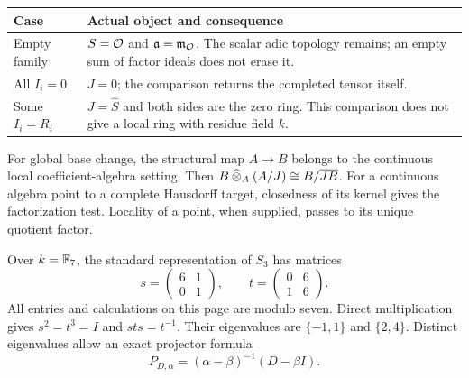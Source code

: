\begin{center}\small
\begin{tabularx}{\linewidth}{@{}p{.22\linewidth}Y@{}}\toprule
Case & Actual object and consequence\\\midrule
Empty family & $S=\mathcal O$ and $\mathfrak a=\mathfrak m_\mathcal O$. The scalar adic topology remains; an empty sum of factor ideals does not erase it.\\
All $I_i=0$ & $J=0$; the comparison returns the completed tensor itself.\\
Some $I_i=R_i$ & $J=\widehat S$ and both sides are the zero ring. This comparison does not give a local ring with residue field $k$.\\\bottomrule
\end{tabularx}
\end{center}

For global base change, the structural map $A\to B$ belongs to the continuous local coefficient-algebra setting. Then $B\mathbin{\widehat\otimes}_A(A/J)\cong B/\overline{JB}$. For a continuous algebra point to a complete Hausdorff target, closedness of its kernel gives the factorization test. Locality of a point, when supplied, passes to its unique quotient factor.


Over $k=\mathbb F_7$, the standard representation of $S_3$ has matrices
\[
 s=\begin{pmatrix}6&1\\0&1\end{pmatrix},\qquad
 t=\begin{pmatrix}0&6\\1&6\end{pmatrix}.
\]
All entries and calculations on this page are modulo seven. Direct multiplication gives $s^2=t^3=I$ and $sts=t^{-1}$. Their eigenvalues are $\{-1,1\}$ and $\{2,4\}$. Distinct eigenvalues allow an exact projector formula
\[
P_{D,\alpha}=(\alpha-\beta)^{-1}(D-\beta I).
\]


